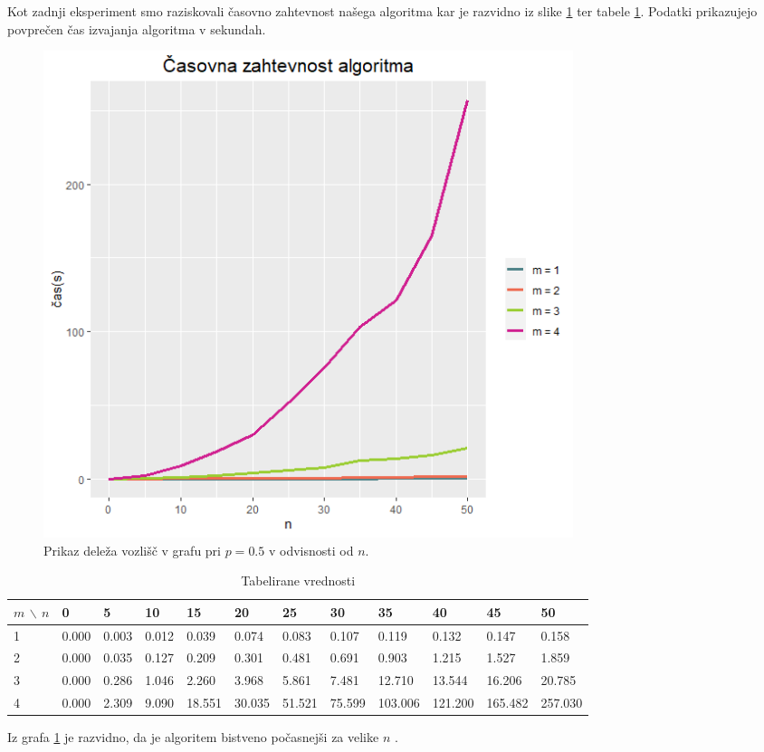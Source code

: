 \documentclass[a4paper, 11pt]{article}
\theoremstyle{definition}
\theoremstyle{definition}
\begin{document}
Kot zadnji eksperiment smo raziskovali časovno zahtevnost našega algoritma kar je 
razvidno iz slike \ref{fig:cas} ter tabele \ref{tab:cas}.
Podatki prikazujejo povprečen čas izvajanja algoritma v sekundah. 


\begin{figure}[h]
    \centering
    \includegraphics[width=0.75\textwidth]{cas.png}
    \caption{Prikaz deleža vozlišč v grafu pri $p=0.5$ v
    odvisnosti od $n$.}
    \label{fig:cas}
\end{figure}

\begin{table}[!ht]
    \caption{Tabelirane vrednosti}
    \label{tab:cas}
    \begin{adjustwidth}{-2cm}{}
    \begin{tabular}{|l|l|l|l|l|l|l|l|l|l|l|l|}
    \hline
        $m$ $\backslash$ $n$ & 0 & 5 & 10 & 15 & 20 & 25 & 30 & 35 & 40 & 45 & 50 \\ \hline
        1 & 0.000 & 0.003 & 0.012 & 0.039 & 0.074 & 0.083 & 0.107 & 0.119 & 0.132 & 0.147 & 0.158 \\ \hline
        2 & 0.000 & 0.035 & 0.127 & 0.209 & 0.301 & 0.481 & 0.691 & 0.903 & 1.215 & 1.527 & 1.859 \\ \hline
        3 & 0.000 & 0.286 & 1.046 & 2.260 & 3.968 & 5.861 & 7.481 & 12.710 & 13.544 & 16.206 & 20.785 \\ \hline
        4 & 0.000 & 2.309 & 9.090 & 18.551 & 30.035 & 51.521 & 75.599 & 103.006 & 121.200 & 165.482 & 257.030 \\ \hline
    \end{tabular}
    \end{adjustwidth}
\end{table}

Iz grafa \ref{fig:cas} je razvidno, da je algoritem bistveno počasnejši za 
velike $n$ .
\end{document}
